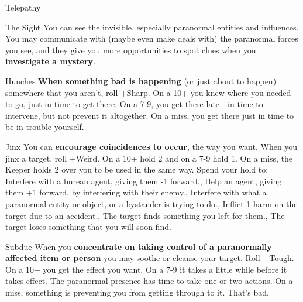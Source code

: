 {\begin{move}{Telepathy}
\end{move}
%
}{%
%
\begin{move}{The Sight}
You can see the invisible, especially paranormal entities and influences. You may communicate with (maybe even make deals with) the paranormal forces you see, and they give you more opportunities to spot clues when you \textbf{investigate a mystery}.
\end{move}%
\br[1mm]
%
\begin{move}{Hunches}
\textbf{When something bad is happening} (or just about to happen) somewhere that you aren’t, roll +Sharp. On a 10+ you knew where you needed to go, just in time to get there. On a 7-9, you get there late—in time to intervene, but not prevent it altogether. On a miss, you get there just in time to be in trouble yourself.
\end{move}%
\br[1mm]
%
\begin{move}{Jinx}
You can \textbf{encourage coincidences to occur}, the way you want. When you jinx a target, roll +Weird. On a 10+ hold 2 and on a 7-9 hold 1. On a miss, the Keeper holds 2 over you to be used in the same way. Spend your hold to:
\holdoptions%
    {{Interfere with a bureau agent, giving them -1 forward.},
    {Help an agent, giving them +1 forward, by interfering with their enemy.},
    {Interfere with what a paranormal entity or object, or a bystander is trying to do.},
    {Inflict 1-harm on the target due to an accident.},
    {The target finds something you left for them.},
    {The target loses something that you will soon find.}}
\end{move}%
\br[1mm]
%
\begin{move}{Subdue}
When you \textbf{concentrate on taking control of a paranormally affected item or person} you may soothe or cleanse your target. Roll +Tough.  On a 10+ you get the effect you want.  On a 7-9 it takes a little while before it takes effect.  The paranormal presence has time to take one or two actions.  On a miss, something is preventing you from getting through to it.  That’s bad. 
\end{move}
%
}\pagebreak%
%
